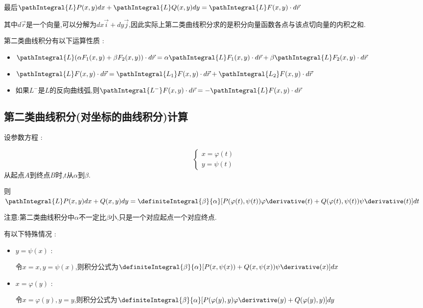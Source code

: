 {{{    最后$\pathIntegral{L}P(x,y)dx + \pathIntegral{L}Q(x,y)dy = \pathIntegral{L}F(x,y) \cdot d\vec{r}$

    其中$d\vec{r}$是一个向量,可以分解为$dx\vec{i} + dy\vec{j}$,因此实际上第二类曲线积分求的是积分向量函数各点与该点切向量的内积之和.

    第二类曲线积分有以下运算性质 :
    \begin{itemize}
      \item $\pathIntegral{L}(\alpha F_1(x,y) + \beta F_2(x,y)) \cdot d\vec{r} = \alpha\pathIntegral{L}F_1(x,y) \cdot d\vec{r} + \beta\pathIntegral{L}F_2(x,y) \cdot d\vec{r}$
      \item $\pathIntegral{L}F(x,y) \cdot d\vec{r} = \pathIntegral{L_1}F(x,y) \cdot d\vec{r} + \pathIntegral{L_2}F(x,y) \cdot d\vec{r}$
      \item 如果$L^-$是$L$的反向曲线弧,则$\pathIntegral{L^-}F(x,y) \cdot d\vec{r} = -\pathIntegral{L}F(x,y) \cdot d\vec{r}$
    \end{itemize}
    }%

    \subsection{第二类曲线积分(对坐标的曲线积分)计算}{
      设参数方程 :
      \begin{center}
        $$
          \begin{cases}
            x = \varphi(t) \\
            y = \psi(t)
          \end{cases}
        $$
        从起点$A$到终点$B$时,$t$从$\alpha$到$\beta$.
      \end{center}
      则$\pathIntegral{L}P(x,y)dx + Q(x,y)dy = \definiteIntegral{\beta}{\alpha}[P(\varphi(t),\psi(t))\varphi\derivative(t) + Q(\varphi(t),\psi(t))\psi\derivative(t)]dt$

      注意:第二类曲线积分中$\alpha$不一定比$\beta$小,只是一个对应起点一个对应终点.

      有以下特殊情况 :
      \begin{itemize}
        \item {
              $y = \psi(x)$ :

              令$x = x,y = \psi(x)$,则积分公式为$\definiteIntegral{\beta}{\alpha}[P(x,\psi(x)) + Q(x,\psi(x))\psi\derivative(x)]dx$
              }
        \item{
              $x = \varphi(y)$ :

              令$x = \varphi(y),y = y$,则积分公式为$\definiteIntegral{\beta}{\alpha}[P(\varphi(y),y)\varphi\derivative(y) + Q(\varphi(y),y)]dy$
              }
      \end{itemize}
    }%

}}
